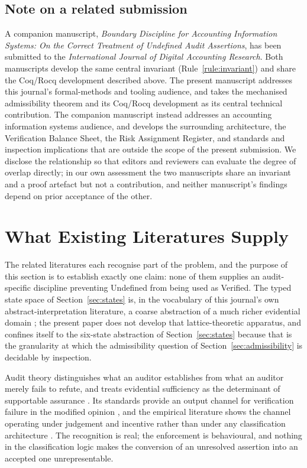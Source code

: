 \documentclass[smallcondensed,envcountsect,natbib]{svjour3}
\newcommand{\state}[1]{\textsf{#1}}
\begin{document}
\subsection*{Note on a related submission}
A companion manuscript, \emph{Boundary Discipline for Accounting Information Systems: On the Correct Treatment of Undefined Audit Assertions}, has been submitted to the \emph{International Journal of Digital Accounting Research}. Both manuscripts develop the same central invariant (Rule~\ref{rule:invariant}) and share the Coq/Rocq development described above. The present manuscript addresses this journal's formal-methods and tooling audience, and takes the mechanised admissibility theorem and its Coq/Rocq development as its central technical contribution. The companion manuscript instead addresses an accounting information systems audience, and develops the surrounding architecture, the Verification Balance Sheet, the Risk Assignment Register, and standards and inspection implications that are outside the scope of the present submission. We disclose the relationship so that editors and reviewers can evaluate the degree of overlap directly; in our own assessment the two manuscripts share an invariant and a proof artefact but not a contribution, and neither manuscript's findings depend on prior acceptance of the other.

\section{What Existing Literatures Supply}
\label{sec:related}

The related literatures each recognise part of the problem, and the purpose of this section is to establish exactly one claim: none of them supplies an audit-specific discipline preventing \state{Undefined} from being used as \state{Verified}. The typed state space of Section~\ref{sec:states} is, in the vocabulary of this journal's own abstract-interpretation literature, a coarse abstraction of a much richer evidential domain \citep{rustenholz2026}; the present paper does not develop that lattice-theoretic apparatus, and confines itself to the six-state abstraction of Section~\ref{sec:states} because that is the granularity at which the admissibility question of Section~\ref{sec:admissibility} is decidable by inspection.

Audit theory distinguishes what an auditor establishes from what an auditor merely fails to refute, and treats evidential sufficiency as the determinant of supportable assurance \citep{mautz1961, knechel2013, nelson2009, hurtt2010}. Its standards provide an output channel for verification failure in the modified opinion \citep{isa705}, and the empirical literature shows the channel operating under judgement and incentive rather than under any classification architecture \citep{habib2013}. The recognition is real; the enforcement is behavioural, and nothing in the classification logic makes the conversion of an unresolved assertion into an accepted one unrepresentable.
\end{document}
